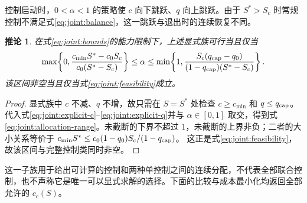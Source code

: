 \documentclass[lang=cn,a4paper,newtx]{elegantpaper}
\numberwithin{equation}{section}
\theoremstyle{plain}
\newtheorem{corollaryn}[theorem]{推论}
\begin{document}
控制启动时，$0<\alpha<1$ 的策略使 $c$ 向下跳跃、$q$ 向上跳跃。由于 $S^*>S_c$ 时常规控制不满足式\eqref{eq:joint:balance}，这一跳跃与退出时的连续恢复不同。
\begin{corollaryn}
\label{cor:joint:allocation-range}
在式\eqref{eq:joint:bounds}的能力限制下，上述显式族可行当且仅当
\begin{equation}
\max\!\left\{0,\frac{c_{\min}S^*-c_0S_c}{c_0(S^*-S_c)}\right\}
\le\alpha\le
\min\!\left\{1,\frac{S_c(q_{\rm cap}-q_0)}{(1-q_{\rm cap})(S^*-S_c)}\right\}.
\label{eq:joint:allocation-range}
\end{equation}
该区间非空当且仅当式\eqref{eq:joint:feasibility}成立。
\end{corollaryn}
\begin{proof}
显式族中 $c$ 不减、$q$ 不增，故只需在 $S=S^*$ 处检查 $c\ge c_{\min}$ 和 $q\le q_{\rm cap}$。代入式\eqref{eq:joint:explicit-c}--\eqref{eq:joint:explicit-q}并与 $\alpha\in[0,1]$ 取交，得到式\eqref{eq:joint:allocation-range}。未截断的下界不超过 $1$，未截断的上界非负；二者的大小关系等价于
$c_{\min}S^*\le c_0(1-q_0)S_c/(1-q_{\rm cap})$。
这正是式\eqref{eq:joint:feasibility}，故该区间与完整控制类同时非空。
\end{proof}
这一子族用于给出可计算的控制和两种单控制之间的连续分配，不代表全部联合控制，也不声称它是唯一可以显式求解的选择。下面的比较与成本最小化均返回全部允许的 $c_c(S)$。
\end{document}
